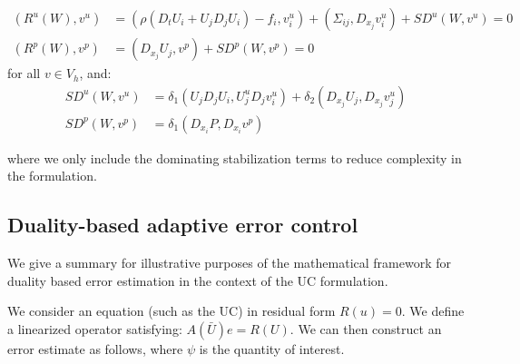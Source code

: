 \begin{align*}
  (R^u(W), v^u) &= (\rho(D_t U_i + U_j D_j U_i) - f_i, v^u_i) + (\Sigma_{ij}, D_{x_j} v^u_i) + SD^u(W, v^u) = 0\\
  (R^p(W), v^p) &= (D_{x_j} U_j, v^p) + SD^p(W, v^p) = 0
\end{align*}
for all $v \in V_h$, and:
\begin{align*}
  SD^u(W, v^u) &= \delta_1 (U_j D_j U_i, U^u_j D_j v^u_i) +
  \delta_2 (D_{x_j} U_j, D_{x_j} v^u_j)\\
  SD^p(W, v^p) &= \delta_1 (D_{x_i} P, D_{x_i} v^p)
\end{align*}

where we only include the dominating stabilization terms to reduce
complexity in the formulation.

\subsection{Duality-based adaptive error control}

We give a summary for illustrative purposes of the mathematical
framework for duality based error estimation in the context of the UC
formulation.

We consider an equation (such as the UC) in residual form $R(u) =
0$. We define a linearized operator satisfying: $A(\bar{U})e =
R(U)$. We can then construct an error estimate as follows, where
$\psi$ is the quantity of interest.

